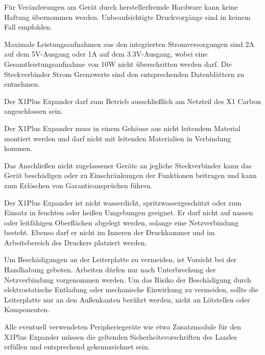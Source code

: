 \documentclass{article}
\begin{document}
Für Veränderungen am Gerät durch herstellerfremde Hardware kann keine Haftung übernommen werden. Unbeaufsichtigte Druckvorgänge sind in keinem Fall empfohlen. 

Maximale Leistungsaufnahmen aus den integrierten Stromversorgungen sind 2A auf dem 5V-Ausgang oder 1A auf dem 3.3V-Ausgang, wobei eine Gesamtleistungsaufnahme von 10W nicht überschritten werden darf. Die Steckverbinder Strom Grenzwerte sind den entsprechenden Datenblättern zu entnehmen.

Der X1Plus Expander darf zum Betrieb ausschließlich am Netzteil des X1 Carbon angeschlossen sein. 

Der X1Plus Expander muss in einem Gehäuse aus nicht leitendem Material montiert werden und darf nicht mit leitenden Materialien in Verbindung kommen.

Das Anschließen nicht zugelassener Geräte an jegliche Steckverbinder kann das Gerät beschädigen oder zu Einschränkungen der Funktionen beitragen und kann zum Erlöschen von Garantieansprüchen führen. 

Der X1Plus Expander ist nicht wasserdicht, spritzwassergeschützt oder zum Einsatz in feuchten oder heißen Umgebungen geeignet. Er darf nicht auf nassen oder leitfähigen Oberflächen abgelegt werden, solange eine Netzverbindung besteht. Ebenso darf er nicht im Inneren der Druckkammer und im Arbeitsbereich des Druckers platziert werden. 

Um Beschädigungen an der Leiterplatte zu vermeiden, ist Vorsicht bei der Handhabung geboten. Arbeiten dürfen nur nach Unterbrechung der Netzverbindung vorgenommen werden. Um das Risiko der Beschädigung durch elektrostatische Entladung oder mechanische Einwirkung zu vermeiden, sollte die Leiterplatte nur an den Außenkanten berührt werden, nicht an Lötstellen oder Komponenten. 

Alle eventuell verwendeten Peripheriegeräte wie etwa Zusatzmodule für den X1Plus Expander müssen die geltenden Sicherheitsvorschriften des Landes erfüllen und entsprechend gekennzeichnet sein.



\enddocument
\end{document}
